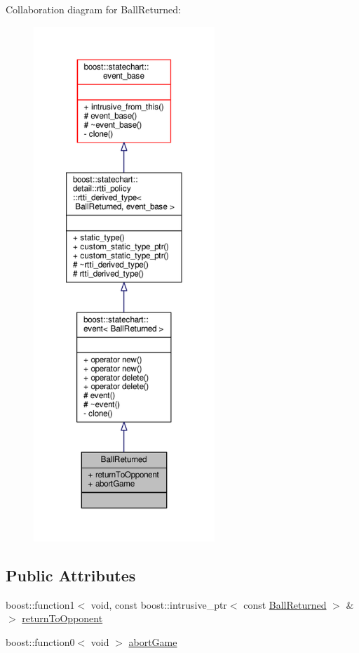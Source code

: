 Collaboration diagram for Ball\+Returned\+:
\nopagebreak
\begin{figure}[H]
\begin{center}
\leavevmode
\includegraphics[height=550pt]{struct_ball_returned__coll__graph}
\end{center}
\end{figure}
\subsection*{Public Attributes}
\begin{DoxyCompactItemize}
\item 
boost\+::function1$<$ void, const boost\+::intrusive\+\_\+ptr$<$ const \mbox{\hyperlink{struct_ball_returned}{Ball\+Returned}} $>$ \&$>$ \mbox{\hyperlink{struct_ball_returned_abaa8b43565818174bd1e41234a52bcec}{return\+To\+Opponent}}
\item 
boost\+::function0$<$ void $>$ \mbox{\hyperlink{struct_ball_returned_a8e02be3939205f10a893cac74713deec}{abort\+Game}}
\end{DoxyCompactItemize}
